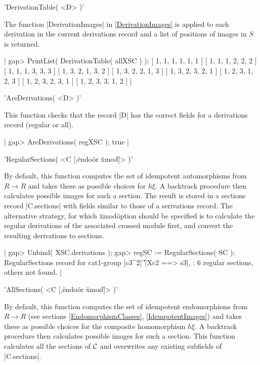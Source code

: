 {'DerivationTable( <D> )'

The function |DerivationImages| in \ref{DerivationImages}
is applied to each derivation in the current derivations record
and a list of positions of images in $S$ is returned.

|    gap> PrintList( DerivationTable( allXSC ) );
    [ 1, 1, 1, 1, 1, 1 ]
    [ 1, 1, 1, 2, 2, 2 ]
    [ 1, 1, 1, 3, 3, 3 ]
    [ 1, 3, 2, 1, 3, 2 ]
    [ 1, 3, 2, 2, 1, 3 ]
    [ 1, 3, 2, 3, 2, 1 ]
    [ 1, 2, 3, 1, 2, 3 ]
    [ 1, 2, 3, 2, 3, 1 ]
    [ 1, 2, 3, 3, 1, 2 ]  |

%

'AreDerivations( <D> )'

This function checks that the record |D| has the correct fields for a
derivations record (regular or all).

|    gap> AreDerivations( regXSC );
    true |

%

'RegularSections( <C [,\"endo\" {\rm or} \"xmod\"]> )'

By default, this function computes the set of idempotent automorphisms
from $R \to R$ and takes these as possible choices for $h\xi$.
A backtrack procedure then calculates possible images for such a section.
The result is stored in a sections record |C.sections| with fields
similar to those of a serivations record.
The alternative strategy, for which \"xmod\" option should be specified
is to calculate the regular derivations of the associated crossed module
first, and convert the resulting derivations to sections.

|    gap> Unbind( XSC.derivations );
    gap> regSC := RegularSections( SC );
    RegularSections record for cat1-group [c3^2|'\|'|Xc2 ==> s3],
    : 6 regular sections, others not found.  |

%

'AllSections( <C [,\"endo\" {\rm or} \"xmod\"]> )'

By default, this function computes the set of idempotent endomorphisms 
from $R \to R$ (see sections \ref{EndomorphismClasses}, \ref{IdempotentImages}) 
and takes these as possible choices for the composite homomorphism $h\xi$.
A backtrack procedure then calculates possible images for such a section.
This function calculates all the sections of ${\cal C}$ and overwrites
any existing subfields of |C.sections|.

}
